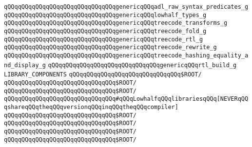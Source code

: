 \verb|qQQqqQQqqQQqqQQqqQQqqQQqqQQqqQQqgenericqQQqadl_raw_syntax_predicates_g|\newline
\verb|qQQqqQQqqQQqqQQqqQQqqQQqqQQqqQQqgenericqQQqlowhalf_types_g|\newline
\verb|qQQqqQQqqQQqqQQqqQQqqQQqqQQqqQQqgenericqQQqtreecode_transforms_g|\newline
\verb|qQQqqQQqqQQqqQQqqQQqqQQqqQQqqQQqgenericqQQqtreecode_fold_g|\newline
\verb|qQQqqQQqqQQqqQQqqQQqqQQqqQQqqQQqgenericqQQqtreecode_rtl_g|\newline
\verb|qQQqqQQqqQQqqQQqqQQqqQQqqQQqqQQqgenericqQQqtreecode_rewrite_g|\newline
\verb|qQQqqQQqqQQqqQQqqQQqqQQqqQQqqQQqgenericqQQqtreecode_hashing_equality_and_display_g|\newline
\verb|qQQqqQQqqQQqqQQqqQQqqQQqqQQqqQQqgenericqQQqrtl_build_g|\newline
\newline
\newline
\newline
\verb|LIBRARY_COMPONENTS|\newline
\newline
\verb|qQQqqQQqqQQqqQQqqQQqqQQqqQQqqQQq$ROOT/|\newline
\newline
\verb|qQQqqQQqqQQqqQQqqQQqqQQqqQQqqQQq$ROOT/|\newline
\verb|qQQqqQQqqQQqqQQqqQQqqQQqqQQqqQQq$ROOT/|\newline
\newline
\newline
\verb|qQQqqQQqqQQqqQQqqQQqqQQqqQQqqQQq#qQQqLowhalfqQQqlibrariesqQQq[NEVERqQQqshareqQQqtheqQQqversionqQQqinqQQqtheqQQqcompiler]|\newline
\verb|qQQqqQQqqQQqqQQqqQQqqQQqqQQqqQQq$ROOT/|\newline
\verb|qQQqqQQqqQQqqQQqqQQqqQQqqQQqqQQq$ROOT/|\newline
\verb|qQQqqQQqqQQqqQQqqQQqqQQqqQQqqQQq$ROOT/|\newline
\verb|qQQqqQQqqQQqqQQqqQQqqQQqqQQqqQQq$ROOT/|\newline
